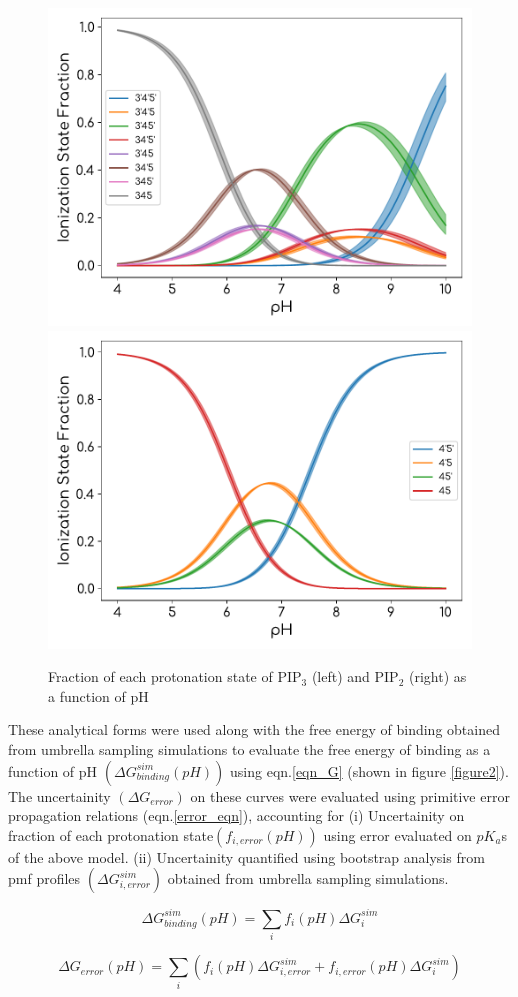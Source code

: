 \documentclass[12pt]{article}
\begin{document}
\begin{figure}[H] 
\begin{center}
\includegraphics[width=0.45\linewidth]{figs/pip3_ionization_fractions.pdf}
\includegraphics[width=0.45\linewidth]{figs/pip2_ionization_fractions.pdf}
\caption{Fraction of each protonation state of PIP$_3$ (left) and PIP$_2$ (right) as a function of pH}
\label{figure1}
\end{center}
\end{figure}


These analytical forms were used along with the free energy of binding obtained from umbrella sampling simulations to evaluate 
the free energy of binding as a function of pH $(\Delta G^{sim}_{binding}(pH))$ using eqn.\ref{eqn_G}  (shown in figure \ref{figure2}). The uncertainity $(\Delta G_{error})$ on these curves 
were evaluated using primitive error propagation relations (eqn.\ref{error_eqn}), accounting for (i) Uncertainity on fraction of each protonation 
state$(f_{i,error}(pH))$ using error evaluated on $pK_a$s of the above model\cite{graber2018effect}. (ii) Uncertainity quantified using bootstrap analysis from pmf profiles $(\Delta G^{sim}_{i,error})$ obtained from umbrella sampling simulations.


\begin{equation}\label{eqn_G}
\Delta G^{sim}_{binding}(pH) = \sum_i f_i(pH)\Delta G_i^{sim}
\end{equation}

\begin{equation}\label{error_eqn}
\Delta G_{error}(pH) = \sum_i (f_i(pH)\Delta G^{sim}_{i,error}+f_{i,error}(pH)\Delta G_i^{sim})
\end{equation}
\end{document}

